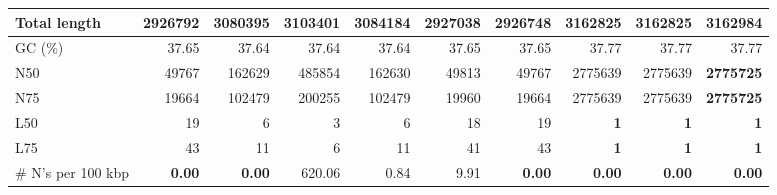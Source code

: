\documentclass[12pt,a4paper]{article}
\begin{document}
\begin{table}[ht]
\begin{center}
\begin{tabular}{|l*{9}{|r}|}
Total length & 2926792 & 3080395 & 3103401 & 3084184 & 2927038 & 2926748 & 3162825 & 3162825 & {\bf 3162984} \\ \hline
GC (\%) & 37.65 & 37.64 & 37.64 & 37.64 & 37.65 & 37.65 & 37.77 & 37.77 & 37.77 \\ \hline
N50 & 49767 & 162629 & 485854 & 162630 & 49813 & 49767 & 2775639 & 2775639 & {\bf 2775725} \\ \hline
N75 & 19664 & 102479 & 200255 & 102479 & 19960 & 19664 & 2775639 & 2775639 & {\bf 2775725} \\ \hline
L50 & 19 & 6 & 3 & 6 & 18 & 19 & {\bf 1} & {\bf 1} & {\bf 1} \\ \hline
L75 & 43 & 11 & 6 & 11 & 41 & 43 & {\bf 1} & {\bf 1} & {\bf 1} \\ \hline
\# N's per 100 kbp & {\bf 0.00} & {\bf 0.00} & 620.06 & 0.84 & 9.91 & {\bf 0.00} & {\bf 0.00} & {\bf 0.00} & {\bf 0.00} \\ \hline
\end{tabular}
\end{center}
\end{table}
\end{document}
